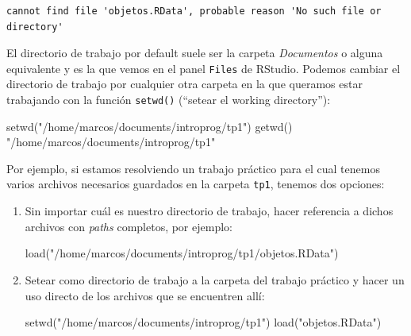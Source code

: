 \documentclass[
]{book}
\newenvironment{Shaded}{\begin{snugshade}}{\end{snugshade}}
\newcommand{\FunctionTok}[1]{\textcolor[rgb]{0.00,0.00,0.00}{#1}}
\newcommand{\NormalTok}[1]{#1}
\newcommand{\StringTok}[1]{\textcolor[rgb]{0.31,0.60,0.02}{#1}}
\begin{document}
\begin{verbatim}
cannot find file 'objetos.RData', probable reason 'No such file or directory'
\end{verbatim}

El directorio de trabajo por default suele ser la carpeta \emph{Documentos} o alguna equivalente y es la que vemos en el panel \texttt{Files} de RStudio. Podemos cambiar el directorio de trabajo por cualquier otra carpeta en la que queramos estar trabajando con la función \texttt{setwd()} (``setear el working directory''):

\begin{Shaded}
\begin{Highlighting}[]
\FunctionTok{setwd}\NormalTok{(}\StringTok{"/home/marcos/documents/introprog/tp1"}\NormalTok{)}
\FunctionTok{getwd}\NormalTok{()}
\StringTok{"/home/marcos/documents/introprog/tp1"}
\end{Highlighting}
\end{Shaded}

Por ejemplo, si estamos resolviendo un trabajo práctico para el cual tenemos varios archivos necesarios guardados en la carpeta \texttt{tp1}, tenemos dos opciones:

\begin{enumerate}
\def\labelenumi{\arabic{enumi}.}
\item
  Sin importar cuál es nuestro directorio de trabajo, hacer referencia a dichos archivos con \emph{paths} completos, por ejemplo:

\begin{Shaded}
\begin{Highlighting}[]
\FunctionTok{load}\NormalTok{(}\StringTok{"/home/marcos/documents/introprog/tp1/objetos.RData"}\NormalTok{)}
\end{Highlighting}
\end{Shaded}
\item
  Setear como directorio de trabajo a la carpeta del trabajo práctico y hacer un uso directo de los archivos que se encuentren allí:

\begin{Shaded}
\begin{Highlighting}[]
\FunctionTok{setwd}\NormalTok{(}\StringTok{"/home/marcos/documents/introprog/tp1"}\NormalTok{)}
\FunctionTok{load}\NormalTok{(}\StringTok{"objetos.RData"}\NormalTok{)}
\end{Highlighting}
\end{Shaded}
\end{enumerate}
\end{document}
